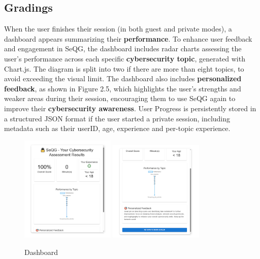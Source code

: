 
\subsection{Gradings}

When the user finishes their session (in both guest and private modes), a dashboard appears summarizing their \textbf{performance}. 
To enhance user feedback and engagement in SeQG, the dashboard includes radar charts assessing the user's performance 
across each specific \textbf{cybersecurity topic}, generated with Chart.js. The diagram is split into two if there are more 
than eight topics, to avoid exceeding the visual limit. The dashboard also includes \textbf{personalized feedback}, as 
shown in Figure 2.5, which highlights the user's strengths and weaker areas during their session, encouraging 
them to use SeQG again to improve their \textbf{cybersecurity awareness}. User Progress is persistently stored in a 
structured JSON format if the user started a private session, including metadata such as their userID, age, 
experience and per-topic experience.

\begin{figure}[H]
    \centering
    \includegraphics[width=0.4\textwidth]{images/Grading2.png}
    \includegraphics[width=0.4\textwidth]{images/Grading3.png}
    \caption{Dashboard}
\end{figure}

